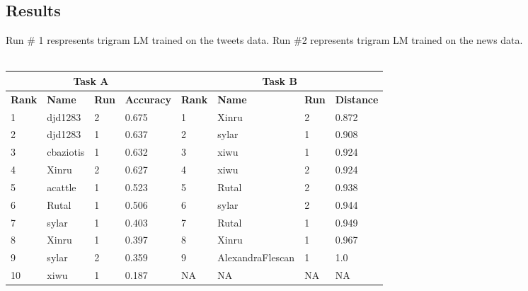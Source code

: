 \documentclass[a0,portrait]{a0poster}
\begin{document}
\begin{multicols}{2}
\color{Navy}

\section*{\LARGE Results}
Run \# 1 respresents trigram LM trained on the tweets data. Run \#2 represents trigram LM trained on the news data.\\\\
\begin{tabular}{l l l l | l l l l} 
\toprule
\multicolumn{4}{c}{Task A} & \multicolumn{4}{|c}{Task B}\\
\hline
\textbf{Rank} & \textbf{Name} & \textbf{Run} & \textbf{Accuracy} & \textbf{Rank} & \textbf{Name} & \textbf{Run} & \textbf{Distance}\\
\hline
1 & djd1283 & 2 & 0.675 & \color{Green} 1 & \color{Green} Xinru	& \color{Green} 2	& \color{Green} 0.872\\
2 & djd1283 & 1 & 0.637 & 2	& sylar	& 1	& 0.908\\
3 & cbaziotis & 1 & 0.632 & 3	& xiwu & 1 & 0.924\\
\color{Green} 4 & \color{Green} Xinru & \color{Green} 2 & \color{Green} 0.627 & 4 & xiwu	& 2 & 0.924\\
5 & acattle & 1 & 0.523 & 5	& Rutal & 2 & 0.938\\
6 & Rutal & 1 & 0.506 & 6 & sylar & 2 & 0.944\\
7 & sylar & 1 & 0.403 & 7 & Rutal & 1 & 0.949\\
\color{Green} 8 & \color{Green} Xinru & \color{Green} 1 & \color{Green} 0.397 & \color{Green}8 & \color{Green} Xinru & \color{Green} 1 & \color{Green} 0.967\\
9 & sylar & 2 & 0.359 & 9 & AlexandraFlescan & 1 & 1.0\\
10 & xiwu & 1 & 0.187 & NA & NA & NA & NA\\
\bottomrule
\end{tabular}


\color{SaddleBrown} %


\end{multicols}
\end{document}
